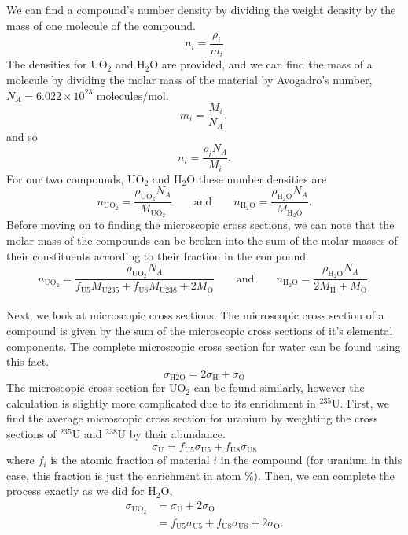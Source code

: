 \documentclass{report}
\begin{document}
\begin{enumerate}[a)]
We can find a compound's number density by dividing the weight density by the mass of one molecule of the compound. 
$$ n_i = \frac{\rho_i}{m_i} $$
The densities for UO$_2$ and H$_2$O are provided, and we can find the mass of a molecule by dividing the molar mass of the material by Avogadro's number, $N_A = 6.022\times10^{23}\text{ molecules/mol}$.
$$ m_i = \frac{M_i}{N_A}, $$
and so
$$ n_i = \frac{\rho_i N_A}{M_i} .$$
For our two compounds, UO$_2$ and H$_2$O these number densities are
$$ n_{\text{UO}_2} = \frac{\rho_{\text{UO}_2} N_A}{M_{\text{UO}_2}} \qquad\text{and}\qquad n_{\text{H}_2\text{O}} = \frac{\rho_{\text{H}_2\text{O}} N_A}{M_{\text{H}_2\text{O}}} .$$
Before moving on to finding the microscopic cross sections, we can note that the molar mass of the compounds can be broken into the sum of the molar masses of their constituents according to their fraction in the compound.
$$ n_{\text{UO}_2} = \frac{\rho_{\text{UO}_2} N_A}{f_{\text{U}5}M_{\text{U235}} + f_{\text{U}8}M_{\text{U238}} + 2M_{\text{O}}} \qquad\text{and}\qquad n_{\text{H}_2\text{O}} = \frac{\rho_{\text{H}_2\text{O}} N_A}{2M_{\text{H}} + M_{\text{O}}} .$$
\-\\

Next, we look at microscopic cross sections. The microscopic cross section of a compound is given by the sum of the microscopic cross sections of it's elemental components. The complete microscopic cross section for water can be found using this fact.
$$ \sigma_{\text{H2O}} = 2\sigma_{\text{H}} + \sigma_{\text{O}} $$
The microscopic cross section for UO$_2$ can be found similarly, however the calculation is slightly more complicated due to its enrichment in $^{235}$U. First, we find the average microscopic cross section for uranium by weighting the cross sections of $^{235}$U and $^{238}$U by their abundance.
$$ \sigma_{\text{U}} = f_{\text{U}5} \sigma_{\text{U}5} + f_{\text{U}8} \sigma_{\text{U}8} $$
where $f_{i}$ is the atomic fraction of material $i$ in the compound (for uranium in this case, this fraction is just the enrichment in atom \%). Then, we can complete the process exactly as we did for H$_2$O,
\begin{align*}
\sigma_{\text{UO}_2}	&= \sigma_{\text{U}} + 2\sigma_{\text{O}} \\
						&= f_{\text{U}5} \sigma_{\text{U}5} + f_{\text{U}8} \sigma_{\text{U}8}  + 2\sigma_{\text{O}}. 
\end{align*}
\-\\


\end{enumerate}
\end{document}
